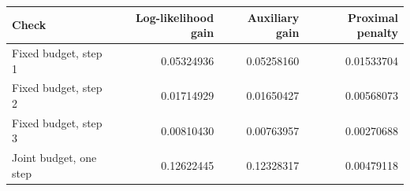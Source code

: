 \begin{tabular}{lrrr}
\toprule
Check & Log-likelihood gain & Auxiliary gain & Proximal penalty\\
\midrule
Fixed budget, step 1 & 0.05324936 & 0.05258160 & 0.01533704 \\
Fixed budget, step 2 & 0.01714929 & 0.01650427 & 0.00568073 \\
Fixed budget, step 3 & 0.00810430 & 0.00763957 & 0.00270688 \\
Joint budget, one step & 0.12622445 & 0.12328317 & 0.00479118 \\
\bottomrule
\end{tabular}
